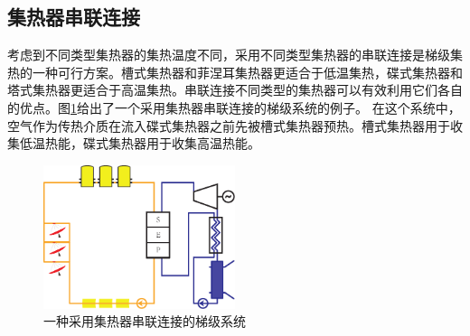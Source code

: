 \subsection{集热器串联连接}
\label{sec:csc}

考虑到不同类型集热器的集热温度不同，采用不同类型集热器的串联连接是梯级集热的一种可行方案。槽式集热器和菲涅耳集热器更适合于低温集热，碟式集热器和塔式集热器更适合于高温集热。串联连接不同类型的集热器可以有效利用它们各自的优点。图\ref{fig:SeriesCollector}给出了一个采用集热器串联连接的梯级系统的例子。 在这个系统中，空气作为传热介质在流入碟式集热器之前先被槽式集热器预热。槽式集热器用于收集低温热能，碟式集热器用于收集高温热能。

\begin{figure}[!ht]
\centering 
\includegraphics[width=0.5\textwidth]{fig/SeriesCollector}
\caption{一种采用集热器串联连接的梯级系统}\label{fig:SeriesCollector}
\end{figure}

